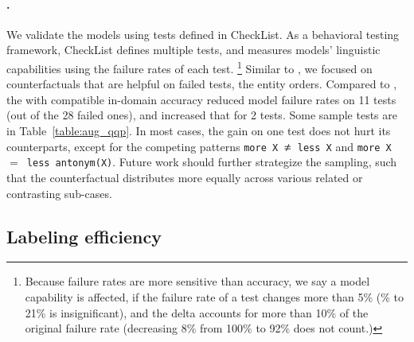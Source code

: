 \paragraph{\qqp.}
We validate the models using tests defined in CheckList.
As a behavioral testing framework, CheckList defines multiple tests, and measures models' linguistic capabilities using the failure rates of each test.
\footnote{Because failure rates are more sensitive than accuracy, we say a model capability is affected, if the failure rate of a test changes more than 5\% (\% to 21\% is insignificant), and the delta accounts for more than 10\% of the original failure rate (\eg decreasing 8\% from 100\% to 92\% does not count.)}
Similar to \nli, we focused on counterfactuals that are helpful on failed tests, \eg the entity orders.
Compared to \mcomp, the \maug with compatible in-domain accuracy reduced model failure rates on 11 tests (out of the 28 failed ones), and increased that for 2 tests.
Some sample tests are in Table~\ref{table:aug_qqp}.
In most cases, the gain on one test does not hurt its counterparts, except for the competing patterns \texttt{more X $\not\eq$ less X} and \texttt{more X $=$ less antonym(X)}.
Future work should further strategize the sampling, such that the counterfactual distributes more equally across various related or contrasting sub-cases. 



\subsection{Labeling efficiency}
\label{subsec:label_procedure}



